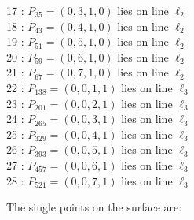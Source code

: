 \documentclass{article}
\begin{document}
{\begin{multicols}{2}
17 : $P_{35}=( 0, 3, 1, 0 )$ lies on line $\ell_{2}$\\
18 : $P_{43}=( 0, 4, 1, 0 )$ lies on line $\ell_{2}$\\
19 : $P_{51}=( 0, 5, 1, 0 )$ lies on line $\ell_{2}$\\
20 : $P_{59}=( 0, 6, 1, 0 )$ lies on line $\ell_{2}$\\
21 : $P_{67}=( 0, 7, 1, 0 )$ lies on line $\ell_{2}$\\
22 : $P_{138}=( 0, 0, 1, 1 )$ lies on line $\ell_{3}$\\
23 : $P_{201}=( 0, 0, 2, 1 )$ lies on line $\ell_{3}$\\
24 : $P_{265}=( 0, 0, 3, 1 )$ lies on line $\ell_{3}$\\
25 : $P_{329}=( 0, 0, 4, 1 )$ lies on line $\ell_{3}$\\
26 : $P_{393}=( 0, 0, 5, 1 )$ lies on line $\ell_{3}$\\
27 : $P_{457}=( 0, 0, 6, 1 )$ lies on line $\ell_{3}$\\
28 : $P_{521}=( 0, 0, 7, 1 )$ lies on line $\ell_{3}$\\
\end{multicols}
The single points on the surface are:\\
}
\end{document}
